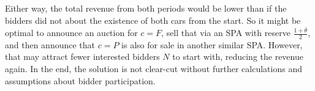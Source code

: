 \documentclass[a4paper]{article}
\begin{document}
\begin{enumerate}
		Either way, the total revenue from both periods would be lower than if the bidders did not about the existence of both cars from the start. So it might be optimal to announce an auction for $c=F$, sell that via an SPA with reserve $\frac{1+\bar{\theta}}{2}$, and then announce that $c=P$ is also for sale in another similar SPA. However, that may attract fewer interested bidders $N$ to start with, reducing the revenue again. In the end, the solution is not clear-cut without further calculations and assumptions about bidder participation.
	\end{enumerate}
	\fi
	
	
	
	
	
	
	
	
\end{document}

